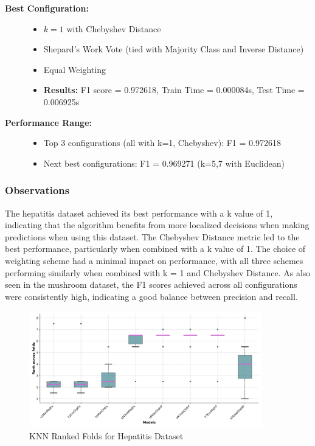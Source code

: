\begin{description}
    \item[\textbf{Best Configuration:}]\leavevmode
        \begin{itemize}
            \item $k = 1$ with Chebyshev Distance
            \item Shepard's Work Vote (tied with Majority Class and Inverse Distance)
            \item Equal Weighting
            \item \textbf{Results:} F1 score = 0.972618, Train Time = 0.000084s, Test Time = 0.006925s
        \end{itemize}
    
    \item[\textbf{Performance Range:}]\leavevmode
        \begin{itemize}
            \item Top 3 configurations (all with k=1, Chebyshev): F1 = 0.972618
            \item Next best configurations: F1 = 0.969271 (k=5,7 with Euclidean)
        \end{itemize}
\end{description}

\subsubsection*{Observations}
The hepatitis dataset achieved its best performance with a k value of 1, indicating that the algorithm benefits from
more localized decisions when making predictions when using this dataset.
The Chebyshev Distance metric led to the best performance, particularly when combined with a k value of 1.
The choice of weighting scheme had a minimal impact on performance, with all three schemes performing similarly when combined with k = 1 and Chebyshev Distance.
As also seen in the mushroom dataset, the F1 scores achieved across all configurations were consistently high, indicating a good balance between precision and recall.

\begin{figure}
    \centering
    \includegraphics[width=0.9\textwidth]{figures/ranked_folds_KNN_hepatitis.png}
    \caption{KNN Ranked Folds for Hepatitis Dataset}
    \label{fig:ranked_folds_KNN_hepatitis}
\end{figure}

